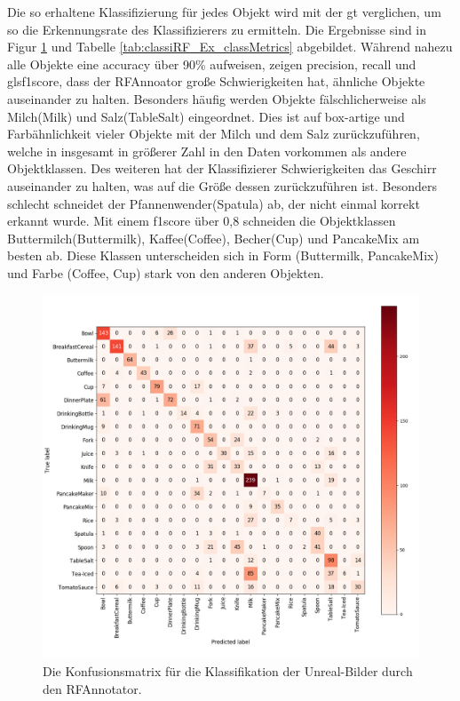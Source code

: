 Die so erhaltene Klassifizierung für jedes Objekt wird mit der \gls{gt} verglichen, um so die Erkennungsrate des Klassifizierers zu ermitteln. Die Ergebnisse sind in Figur \ref{fig:classiRF_Ex_confMatrix} und Tabelle \ref{tab:classiRF_Ex_classMetrics} abgebildet. Während nahezu alle Objekte eine \gls{accuracy} über 90\% aufweisen, zeigen \gls{precision}, \gls{recall} und gls{f1score}, dass der RFAnnoator große Schwierigkeiten hat, ähnliche Objekte auseinander zu halten. Besonders häufig werden Objekte fälschlicherweise als Milch(Milk) und Salz(TableSalt)  eingeordnet. Dies ist auf box-artige und Farbähnlichkeit vieler Objekte mit der Milch und dem Salz zurückzuführen, welche in insgesamt in größerer Zahl in den Daten vorkommen als andere Objektklassen. Des weiteren hat der Klassifizierer Schwierigkeiten das Geschirr auseinander zu halten, was auf die Größe dessen zurückzuführen ist. Besonders schlecht schneidet der Pfannenwender(Spatula) ab, der nicht einmal korrekt erkannt wurde. Mit einem \gls{f1score} über 0,8 schneiden die Objektklassen Buttermilch(Buttermilk), Kaffee(Coffee), Becher(Cup) und PancakeMix am besten ab. Diese Klassen unterscheiden sich in Form (Buttermilk, PancakeMix) und Farbe (Coffee, Cup) stark von den anderen Objekten.  

\begin{figure}
	\includegraphics[scale=.4]{img/chapter6/classifierRFconf_matrix.png}
\caption[Konfusionsmatrix der Klassifizierung durch den RFAnnotators]{Die Konfusionsmatrix für die Klassifikation der Unreal-Bilder durch den RFAnnotator.}
\label{fig:classiRF_Ex_confMatrix}
\end{figure}

